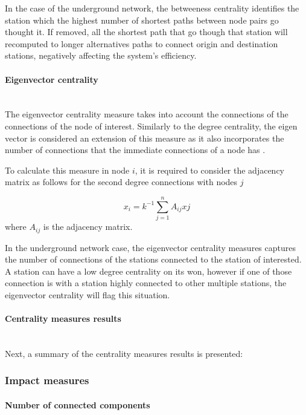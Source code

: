 \documentclass{article}
\begin{document}
In the case of the underground network, the betweeness centrality identifies the station which the highest number of shortest paths between node pairs go thought it. If removed, all the shortest path that go though that station will recomputed to longer alternatives paths to connect origin and destination stations, negatively affecting the system's efficiency.

\paragraph{Eigenvector centrality}\mbox{}\\

The eigenvector centrality measure takes into account the connections of the connections of the node of interest. Similarly to the degree centrality, the eigen vector is considered an extension of this measure as it also incorporates the number of connections that the immediate connections of a node has \citep{newmanNetworks2018}.


To calculate this measure in node $i$, it is required to consider the adjacency matrix as follows for the second degree connections with nodes $j$

\[x_{i}={k^{-1}}\sum_{j=1}^{n} {A_{ij}}{x{j}}\] where ${A_{ij}}$ is the adjacency matrix.

In the underground network case, the eigenvector centrality measures captures the number of connections of the stations connected to the station of interested. A station can have a low degree centrality on its won, however if one of those connection is with a station highly connected to other multiple stations, the eigenvector centrality will flag this situation.

\paragraph{Centrality measures results}\mbox{}\\

Next, a summary of the centrality measures results is presented:



\subsubsection{Impact measures}

\paragraph{Number of connected components}\mbox{}\\
\end{document}
